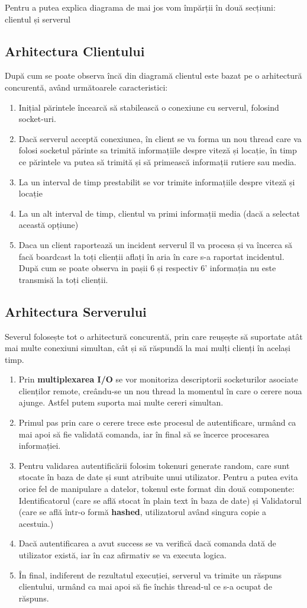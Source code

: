 \documentclass{article}
\begin{document}
Pentru a putea explica diagrama de mai jos vom împărții în două secțiuni: clientul și serverul
\subsection{Arhitectura Clientului}
După cum se poate observa încă din diagramă clientul este bazat pe o arhitectură concurentă, având următoarele caracteristici:
\begin{enumerate}
    \item Inițial părintele încearcă să stabilească o conexiune cu serverul, folosind socket-uri. 
    \item Dacă serverul acceptă conexiunea, în client se va forma un nou thread care va folosi socketul părinte sa trimită informațiile despre viteză și locație, în timp ce părintele va putea să trimită și să primească informații rutiere sau media.  
    \item La un interval de timp prestabilit se vor trimite informațiile despre viteză și locație
    \item La un alt interval de timp, clientul va primi informații media (dacă a selectat această opțiune)
    \item Daca un client raportează un incident serverul îl va procesa și va încerca să facă boardcast la toți clienții aflați în aria în care s-a raportat incidentul. După cum se poate observa in pașii 6 și respectiv 6' informația nu este transmisă la toți clienții.
\end{enumerate}
\subsection{Arhitectura Serverului}
Severul folosește tot o arhitectură concurentă, prin care reușește să suportate atât mai multe conexiuni simultan, cât și să răspundă la mai mulți clienți în același timp.
\begin{enumerate}
    \item Prin \textbf{multiplexarea I/O} se vor monitoriza descriptorii socketurilor asociate clienților remote, creându-se un nou thread la momentul în care o cerere noua ajunge. Astfel putem suporta mai multe cereri simultan.
    \item Primul pas prin care o cerere trece este procesul de autentificare, urmând ca mai apoi să fie validată comanda, iar în final să se încerce procesarea informației. 
    \item Pentru validarea autentificării folosim tokenuri generate random, care sunt stocate în baza de date și sunt atribuite unui utilizator. Pentru a putea evita orice fel de manipulare a datelor, tokenul este format din două componente: Identificatorul (care se află stocat în plain text în baza de date) și Validatorul (care se află într-o formă \textbf{hashed}, utilizatorul având singura copie a acestuia.)
    \item Dacă autentificarea a avut success se va verifică dacă comanda dată de utilizator există, iar în caz afirmativ se va executa logica. 
    \item În final, indiferent de rezultatul execuției, serverul va trimite un răspuns clientului, urmând ca mai apoi să fie închis thread-ul ce s-a ocupat de răspuns.
\end{enumerate}
\end{document}
